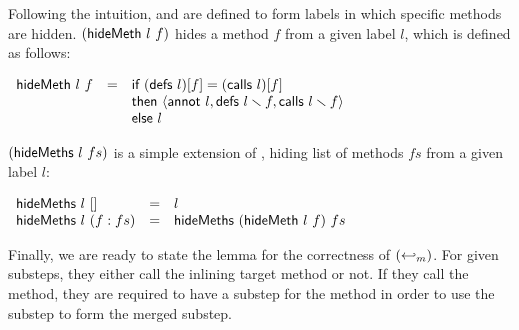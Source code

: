 Following the intuition, \hidemethsym{} and \hidemethssym{} are
defined to form labels in which specific methods are
hidden. $(\textsf{hideMeth}{}\ l\ f)$ hides a method $f$ from a given label $l$,
which is defined as follows:
\begin{definition}
  \label{def-hidemeth}
  \mbox{}
  \begin{center}
    \begin{math}
      \begin{array}{lcl}
        \textsf{hideMeth}{}\ l\ f & = & \textsf{if}\ {} (\textsf{defs}\ l)[f] = (\textsf{calls}\ l)[f] \\
        & & \textsf{then}\ {} \langle \textsf{annot}\ l, \textsf{defs}\ l \smallsetminus{} f, \textsf{calls}\ l \smallsetminus{} f \rangle \\
        & & \textsf{else}\ {} l
      \end{array}
    \end{math}
  \end{center}
\end{definition}
$(\textsf{hideMeths}{}\ l\ fs)$ is a simple extension of \hidemethsym{}, hiding
list of methods $fs$ from a given label $l$:
\begin{definition}
  \label{def-hidemeths}
  \mbox{}
  \begin{center}
    \begin{math}
      \begin{array}{lcl}
        \textsf{hideMeths}{}\ l\ [] & = & l \\
        \textsf{hideMeths}{}\ l\ (f : fs) & = & \textsf{hideMeths}{}\ (\textsf{hideMeth}{}\ l\ f)\ fs
      \end{array}
    \end{math}
  \end{center}
\end{definition}

Finally, we are ready to state the lemma for the correctness of
$(\hookleftarrow_{m})$. For given substeps, they either call the inlining
target method or not. If they call the method, they are required to
have a substep for the method in order to use the substep to form the
merged substep.

